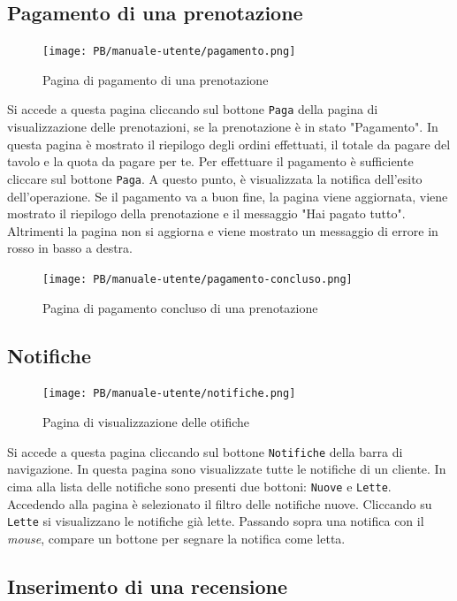 \subsection{Pagamento di una prenotazione}
\begin{figure}[htbp]
    \centering
	\texttt{[image: PB/manuale-utente/pagamento.png]}
    \caption{Pagina di pagamento di una prenotazione}
\end{figure}

Si accede a questa pagina cliccando sul bottone \texttt{Paga} della pagina di
visualizzazione delle prenotazioni, se la prenotazione è in stato "Pagamento".
In questa pagina è mostrato il riepilogo degli ordini effettuati, il totale da
pagare del tavolo e la quota da pagare per te. Per effettuare il pagamento è
sufficiente cliccare sul bottone \texttt{Paga}. A questo punto, è visualizzata
la notifica dell'esito dell'operazione. Se il pagamento va a buon fine, la
pagina viene aggiornata, viene mostrato il riepilogo della prenotazione e il
messaggio "Hai pagato tutto". Altrimenti la pagina non si aggiorna e viene
mostrato un messaggio di errore in rosso in basso a destra.

\begin{figure}[htbp]
    \centering
	\texttt{[image: PB/manuale-utente/pagamento-concluso.png]}
    \caption{Pagina di pagamento concluso di una prenotazione}
\end{figure}

\subsection{Notifiche}

\begin{figure}[htbp]
    \centering
	\texttt{[image: PB/manuale-utente/notifiche.png]}
    \caption{Pagina di visualizzazione delle otifiche}
\end{figure}

Si accede a questa pagina cliccando sul bottone \texttt{Notifiche} della barra di
navigazione. In questa pagina sono visualizzate tutte le notifiche di un
cliente. In cima alla lista delle notifiche sono presenti due bottoni:
\texttt{Nuove} e \texttt{Lette}. Accedendo alla pagina è selezionato il filtro
delle notifiche nuove. Cliccando su \texttt{Lette} si visualizzano le notifiche
già lette. Passando sopra una notifica con il \textit{mouse}, compare un bottone per
segnare la notifica come letta.

\subsection{Inserimento di una recensione}

